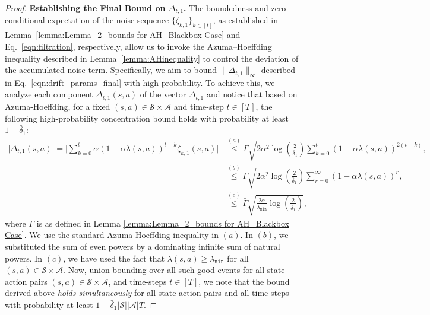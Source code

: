\documentclass{article}
\newcommand{\mc}{\mathcal}
\begin{document}
\begin{proof}
\textbf{Establishing the Final Bound on \(\Delta_{t,1}\).} The boundedness and zero conditional expectation of the noise sequence $\{\zeta_{k,1}\}_{k \in [t]}$, as established in Lemma~\ref{lemma:Lemma_2_bounds for AH_Blackbox Case} and Eq.~\eqref{eqn:filtration}, respectively, allow us to invoke the Azuma--Hoeffding inequality described in Lemma~\ref{lemma:AHinequality} to control the deviation of the accumulated noise term. Specifically, we aim to bound \(\rVert \Delta_{t,1} \lVert_{\infty}\) described in Eq.~\eqref{eqn:drift_params_final} with high probability. To achieve this, we analyze each component \(\Delta_{t,1}(s,a)\) of the vector $\Delta_{t,1}$ and notice that based on Azuma-Hoeffding, for a fixed $(s,a) \in \mathcal{S} \times \mathcal{A}$ and time-step $t \in [T]$, the following high-probability concentration bound holds with probability at least $1 - \bar{\delta}_1$:
\begin{equation}
\begin{aligned}
   \lvert \Delta_{t,1}(s,a) \rvert = \bigg\lvert \sum_{k=0}^{t} \alpha (1-\alpha \lambda(s,a))^{t-k} \zeta_{k,1}(s,a) \bigg\rvert 
    &\overset{(a)}{\le} \bar{\Gamma} \sqrt{2\alpha^2 \log \left( \frac{2}{\bar{\delta}_1} \right) \sum_{k=0}^{t} (1-\alpha \lambda(s,a))^{2(t-k)}}, \\
    &\overset{(b)}{\le} \bar{\Gamma} \sqrt{2\alpha^2 \log \left( \frac{2}{\bar{\delta}_1} \right) \sum_{r=0}^{\infty} (1-\alpha \lambda(s,a))^{r}}, \\
    &\overset{(c)}{\le} \bar{\Gamma} \sqrt{\frac{2\alpha}{\lambda_{\texttt{min}}} \log \left( \frac{2}{\bar{\delta}_1} \right)},
\end{aligned}
\end{equation}
where \(\bar{\Gamma}\) is as defined in Lemma \ref{lemma:Lemma_2_bounds for AH_Blackbox Case}. We use the standard Azuma-Hoeffding inequality in \((a)\). In $(b)$, we substituted the sum of even powers by a dominating infinite sum of natural powers. In \((c)\), we have used the fact that \(\lambda(s,a) \ge \lambda_{\texttt{min}}\) for all \((s,a) \in \mc{S} \times \mc{A}\). Now, union bounding over all such good events for all state-action pairs \((s,a) \in \mathcal{S} \times \mathcal{A}\), and time-steps \(t \in [T]\), we note that the bound derived above \emph{holds simultaneously} for all state-action pairs and all time-steps 
with probability at least \(1-\bar{\delta}_1|\mc{S}||\mc{A}|T\).


\end{proof}
\end{document}
